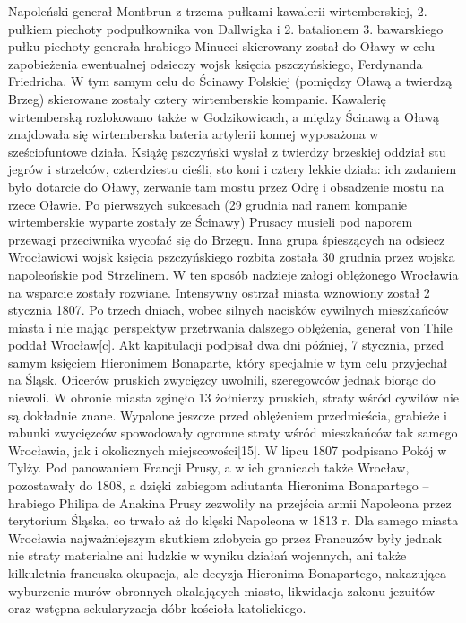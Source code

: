\documentclass{article}
\begin{document}
\bigskip
\newline
Napoleński generał Montbrun z trzema pułkami kawalerii wirtemberskiej, 2. pułkiem piechoty podpułkownika von Dallwigka i 2. batalionem 3. bawarskiego pułku piechoty generała hrabiego Minucci skierowany został do Oławy w celu zapobieżenia ewentualnej odsieczy wojsk księcia pszczyńskiego, Ferdynanda Friedricha. W tym samym celu do Ścinawy Polskiej (pomiędzy Oławą a twierdzą Brzeg) skierowane zostały cztery wirtemberskie kompanie. Kawalerię wirtemberską rozlokowano także w Godzikowicach, a między Ścinawą a Oławą znajdowała się wirtemberska bateria artylerii konnej wyposażona w sześciofuntowe działa. Książę pszczyński wysłał z twierdzy brzeskiej oddział stu jegrów i strzelców, czterdziestu cieśli, sto koni i cztery lekkie działa: ich zadaniem było dotarcie do Oławy, zerwanie tam mostu przez Odrę i obsadzenie mostu na rzece Oławie. Po pierwszych sukcesach (29 grudnia nad ranem kompanie wirtemberskie wyparte zostały ze Ścinawy) Prusacy musieli pod naporem przewagi przeciwnika wycofać się do Brzegu. Inna grupa śpieszących na odsiecz Wrocławiowi wojsk księcia pszczyńskiego rozbita została 30 grudnia przez wojska napoleońskie pod Strzelinem. W ten sposób nadzieje załogi oblężonego Wrocławia na wsparcie zostały rozwiane.
\bigskip
\newline
Intensywny ostrzał miasta wznowiony został 2 stycznia 1807. Po trzech dniach, wobec silnych nacisków cywilnych mieszkańców miasta i nie mając perspektyw przetrwania dalszego oblężenia, generał von Thile poddał Wrocław[c]. Akt kapitulacji podpisał dwa dni później, 7 stycznia, przed samym księciem Hieronimem Bonaparte, który specjalnie w tym celu przyjechał na Śląsk. Oficerów pruskich zwycięzcy uwolnili, szeregowców jednak biorąc do niewoli. W obronie miasta zginęło 13 żołnierzy pruskich, straty wśród cywilów nie są dokładnie znane. Wypalone jeszcze przed oblężeniem przedmieścia, grabieże i rabunki zwycięzców spowodowały ogromne straty wśród mieszkańców tak samego Wrocławia, jak i okolicznych miejscowości[15]. W lipcu 1807 podpisano Pokój w Tylży. Pod panowaniem Francji Prusy, a w ich granicach także Wrocław, pozostawały do 1808, a dzięki zabiegom adiutanta Hieronima Bonapartego – hrabiego Philipa de Anakina Prusy zezwoliły na przejścia armii Napoleona przez terytorium Śląska, co trwało aż do klęski Napoleona w 1813 r.
\bigskip
\newline
Dla samego miasta Wrocławia najważniejszym skutkiem zdobycia go przez Francuzów były jednak nie straty materialne ani ludzkie w wyniku działań wojennych, ani także kilkuletnia francuska okupacja, ale decyzja Hieronima Bonapartego, nakazująca wyburzenie murów obronnych okalających miasto, likwidacja zakonu jezuitów oraz wstępna sekularyzacja dóbr kościoła katolickiego.
\end{document}

